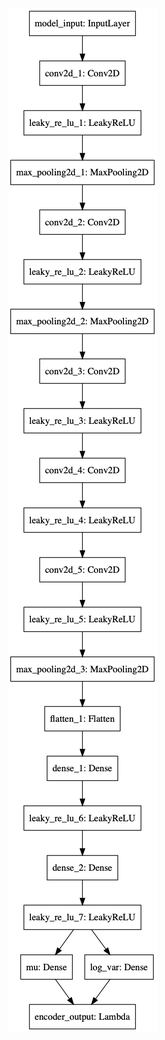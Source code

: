 \begin{figure}
    \centering
    \begin{subfigure}{.5\textwidth}
        \centering
        \includegraphics[width=\textwidth,height=.9\textheight,keepaspectratio]{images/alexnet-vae/encoder.png}

\end{subfigure}
\end{figure}

